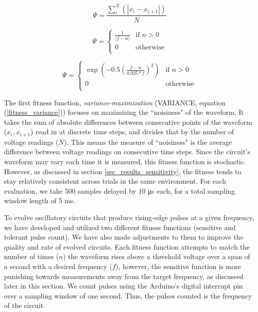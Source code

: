 \documentclass{ieeeaccess}
\begin{document}
\begin{equation}
\label{fitness_variance}
\Psi = \frac{\sum_{i}^{N} {(|x_i - x_{i+1}|)}}{N}
\end{equation}

\begin{equation}
\label{fitness_pulse_sensitive}
\Psi = \begin{cases}
        \frac{1}{|f - n|} & \text{if } n > 0\\
        0 & \text{otherwise}\\
        \end{cases}
\end{equation}


\begin{equation}
\label{fitness_pulse_tolerant}
\Psi = \begin{cases}
        \exp(-0.5 (\frac{f-n}{0.025*f})^2) & \text{if } n > 0\\
        0 & \text{otherwise}\\
        \end{cases}
\end{equation}


The first fitness function, \textit{variance-maximization} (VARIANCE, equation (\ref{fitness_variance})) focuses on maximizing the ``noisiness" of the waveform. It takes the sum of absolute differences between consecutive points of the waveform ($x_i,x_{i+1}$) read in at discrete time steps, and divides that by the number of voltage readings ($N$). This means the measure of ``noisiness" is the average difference between voltage readings on consecutive time steps. Since the circuit's waveform may vary each time it is measured, this fitness function is stochastic. However, as discussed in section \ref{sec_results_sensitivity}, the fitness tends to stay relatively consistent across trials in the same environment. For each evaluation, we take 500 samples delayed by 10 \si{\micro\second} each, for a total sampling window length of 5 \si{\milli\second}. 

To evolve oscillatory circuits that produce rising-edge pulses at a given frequency, we have developed and utilized two different fitness functions (sensitive and tolerant pulse count). We have also made adjustments to them to improve the quality and rate of evolved circuits. Each fitness function attempts to match the number of times ($n$) the waveform rises above a threshold voltage over a span of a second with a desired frequency ($f$), however, the sensitive function is more punishing towards measurements away from the target frequency, as discussed later in this section. We count pulses using the Arduino's digital interrupt pin over a sampling window of one second. Thus, the pulses counted is the frequency of the circuit. 
\end{document}
